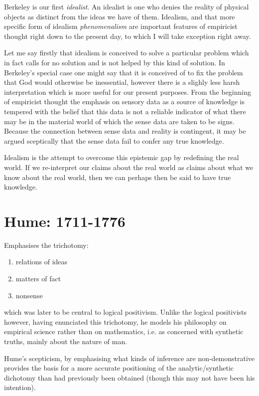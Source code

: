 Berkeley is our first {\it idealist}.
An idealist is one who denies the reality of physical objects as distinct from the ideas we have of them.
Idealism, and that more specific form of idealism {\it phenomenalism} are important features of empiricist thought right down to the present day, to which I will take exception right away.

Let me say firstly that idealism is conceived to solve a particular problem which in fact calls for no solution and is not helped by this kind of solution.
In Berkeley's special case one might say that it is conceived of to fix the problem that God would otherwise be inessential, however there is a slighly less harsh interpretation which is more useful for our present purposes.
From the beginning of empiricist thought the emphasis on sensory data as a source of knowledge is tempered with the belief that this data is not a reliable indicator of what there may be in the material world of which the sense data are taken to be signs.
Because the connection between sense data and reality is contingent, it may be argued sceptically that the sense data fail to confer any true knowledge.

Idealism is the attempt to overcome this epistemic gap by redefining the real world.
If we re-interpret our claims about the real world as claims about what we know about the real world, then we can perhaps then be said to have true knowledge.


\section{Hume: 1711-1776}

Emphasises the trichotomy:
\begin{enumerate}
\item relations of ideas
\item matters of fact
\item nonsense
\end{enumerate}

which was later to be central to logical positivism.
Unlike the logical positivists however, having enunciated this trichotomy, he models his philosophy on empirical science rather than on mathematics, i.e. as concerned with synthetic truths, mainly about the nature of man.

Hume's scepticism, by emphasising what kinds of inference are non-demonstrative provides the basis for a more accurate positioning of the analytic/synthetic dichotomy than had previously been obtained (though this may not have been his intention).

